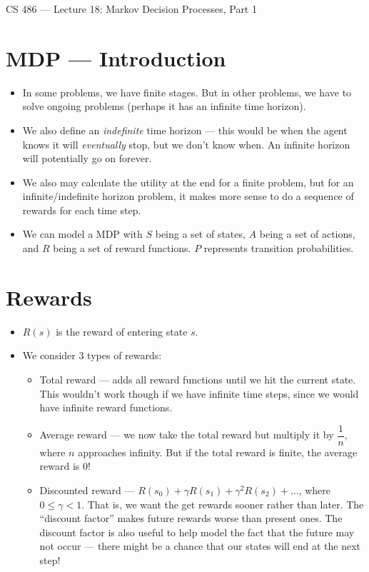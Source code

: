 \documentclass{article}
\author{Clement Tsang}
\begin{document}
\begin{center}
    \Large{CS 486 --- Lecture 18: Markov Decision Processes, Part 1}
\end{center}

\section{MDP --- Introduction}
\begin{itemize}
    \item In some problems, we have finite stages.  But in other problems, we have to solve ongoing problems (perhaps it has an infinite time horizon).
    \item We also define an \emph{indefinite} time horizon --- this would be when the agent knows it will \emph{eventually} stop, but we don't know when.  An infinite horizon will potentially go on forever.
    \item We also may calculate the utility at the end for a finite problem, but for an infinite/indefinite horizon problem, it makes more sense to do a sequence of rewards for each time step.
    \item We can model a MDP with $S$ being a set of states, $A$ being a set of actions, and $R$ being a set of reward functions.  $P$ represents transition probabilities.
\end{itemize}

\section{Rewards}
\begin{itemize}
    \item $R(s)$ is the reward of entering state $s$.
    \item We consider 3 types of rewards:
        \begin{itemize}
            \item Total reward --- adds all reward functions until we hit the current state.  This wouldn't work though if we have infinite time steps, since we would have infinite reward functions.
            \item Average reward --- we now take the total reward but multiply it by $\dfrac{1}{n}$, where $n$ approaches infinity.  But if the total reward is finite, the average reward is 0!
            \item Discounted reward --- $R(s_0) + \gamma R(s_1) + \gamma^2 R(s_2) + \dots$, where $0 \leq \gamma < 1$.  That is, we want the get rewards sooner rather than later.  The ``discount factor'' makes future rewards worse than present ones.  The discount factor is also useful to help model the fact that the future may not occur --- there might be a chance that our states will end at the next step!
        \end{itemize}
\end{itemize}
\end{document}
